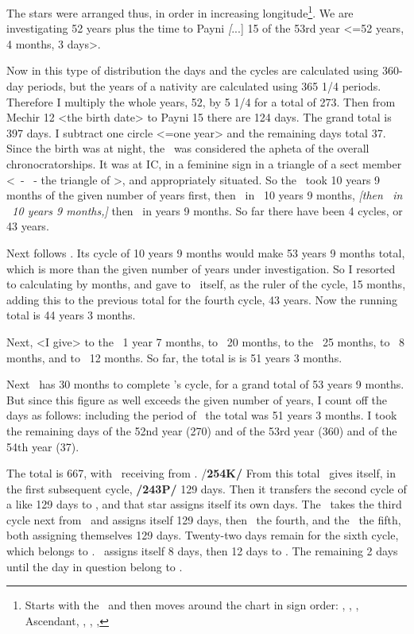The stars were arranged thus, in order in increasing longitude\footnote{Starts with the \Moon\, and then moves around the chart in sign order: \Moon, \Venus, \Jupiter, Ascendant, \Saturn, \Mars, \Sun, \Mercury}. We are investigating 52 years plus the time to Payni \textsl[...] 15 of the 53rd year <=52 years, 4 months, 3 days>. 

Now in this type of distribution the days and the cycles are calculated using 360-day periods, but the years of a nativity are calculated using 365 1/4 periods. Therefore I multiply the whole years, 52, by 5 1/4 for a total of 273. Then from Mechir 12 <the birth date> to Payni 15 there are 124 days. The grand total is 397 days. I subtract one circle <=one year> and the remaining days total 37. Since the birth was at night, the \Moon\, was considered the apheta of the overall chronocratorships. It was at IC, in a feminine sign in a triangle of a sect member <\Pisces\, - \Cancer\, - \Scorpio  the triangle of \Venus>, and appropriately situated. So the \Moon\, took 10 years 9 months of the given number of years first, then \Venus\, in \Aries\, 10 years 9 months, \textsl{[then \Jupiter\, in \Libra\, 10 years 9 months,]} then \Saturn\, in  years 9 months. So far there have been 4 cycles, or 43 years.

Next follows \Mars. Its cycle of 10 years 9 months would make 53 years 9 months total, which is more than the given number of years under investigation. So I resorted to calculating by months, and gave to \Mars\, itself, as the ruler of the cycle, 15 months, adding this to the previous total for the fourth cycle, 43 years. Now the running total is 44 years 3 months. 

Next, <I give> to the \Sun\, 1 year 7 months, to \Mercury\, 20 months, to the \Moon\, 25 months, to \Venus\, 8 months, and to \Jupiter\, 12 months. So far, the total is is 51 years 3 months. 

Next \Saturn\, has 30 months to complete \Mars’s cycle, for a grand total of 53 years 9 months. But since this figure as well exceeds the given number of years, I count off the days as follows: including the period of \Jupiter\, the total was 51 years 3 months. I took the remaining days of the 52nd year (270) and of the 53rd year (360) and of the 54th year (37). 

The total is 667, with \Saturn\, receiving from \Mars. /\textbf{254K/} From this total \Saturn\, gives itself, in the first subsequent cycle, \textbf{/243P/} 129 days. Then it transfers the second cycle of a like 129 days to \Mars, and that star assigns itself its own days. The \Sun\, takes the third cycle next from \Saturn\, and assigns itself 129 days, then \Mercury\, the fourth, and the \Moon\, the fifth, both assigning themselves 129 days. Twenty-two days remain for the sixth cycle, which belongs to \Venus. \Venus\, assigns itself 8 days, then 12 days to \Jupiter. The remaining 2 days until the day in question belong to \Saturn. 

